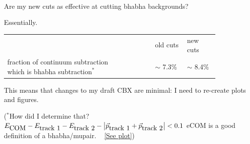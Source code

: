 \documentclass[landscape]{article}
\newenvironment{slide}{\mbox{ }\vfill}{\vfill \mbox{ } \pagebreak}
\begin{document}
\begin{slide}
  \vfill
  \begin{center}
    \begin{minipage}{0.85\linewidth} Are my new cuts as effective at cutting bhabha backgrounds? \end{minipage}

    \vfill \begin{minipage}{0.85\linewidth} Essentially. \end{minipage}

    \vspace{0.5 cm} \begin{minipage}{0.85\linewidth} \begin{center} \begin{tabular}{p{0.5\linewidth} p{0.1\linewidth} p{0.13\linewidth} p{0.13\linewidth}}
	& & old cuts & new cuts \\
	fraction of continuum subtraction which is bhabha subtraction$^*$ & & $\sim$ 7.3\% & $\sim$ 8.4\% \\
      \end{tabular} \end{center} \end{minipage}

    \vfill \begin{minipage}{0.85\linewidth} This means that changes to my draft CBX are minimal: I need to re-create plots and figures. \end{minipage}

    \vfill \mbox{\vspace{1 cm}} \begin{minipage}{0.85\linewidth}
    ($^*$How did I determine that?  $E_{\mbox{\normalsize COM}} -
    E_{\mbox{\normalsize track 1}} - E_{\mbox{\normalsize track 2}} -
    \big| \vec{p}_{\mbox{\normalsize track 1}} +
    \vec{p}_{\mbox{\normalsize track 2}} \big| < 0.1$ eCOM is a good
    definition of a bhabha/mupair. \hypertarget{cutseffective}{\mbox{ }}
    \href{#lastplot}{[See plot]}) \end{minipage}
  \end{center}
  \vfill
\end{slide}
\end{document}
